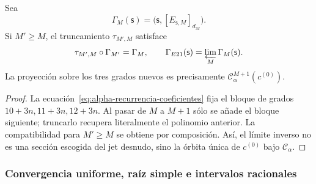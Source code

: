 \begin{proposition}
\label{prop:alpha-naturalidad-recurrencia-explicita}
Sea
\[
 \Gamma_M(\mathsf s)
 =\bigl(\mathsf s,[E_{\mathsf s,M}]_{d_M}\bigr).
\]
Si \(M'\geq M\), el truncamiento \(\tau_{M',M}\) satisface
\begin{equation}
 \tau_{M',M}\circ\Gamma_{M'}=\Gamma_M,
 \qquad
 \Gamma_{E21}(\mathsf s)=\varprojlim_M\Gamma_M(\mathsf s).
 \label{eq:alpha-naturalidad-explicita}
\end{equation}
La proyección sobre los tres grados nuevos es precisamente
\(\mathcal C_\alpha^{M+1}(c^{(0)})\).
\end{proposition}

\begin{proof}
La ecuación~\eqref{eq:alpha-recurrencia-coeficientes} fija el bloque de
grados \(10+3n,11+3n,12+3n\). Al pasar de \(M\) a \(M+1\) sólo se añade
el bloque siguiente; truncarlo recupera literalmente el polinomio anterior.
La compatibilidad para \(M'\geq M\) se obtiene por composición. Así, el
límite inverso no es una sección escogida del jet desnudo, sino la órbita
única de \(c^{(0)}\) bajo \(\mathcal C_\alpha\).
\end{proof}

\subsubsection{Convergencia uniforme, raíz simple e intervalos racionales}
\label{subsec:alpha-cotas-completas-rev08}

